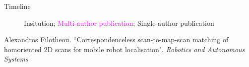 \begin{frame}{Timeline}

\begin{figure}[t!] \centering
        
        \caption{\textcolor[RGB]{32,74,135}{Insitution}; \textcolor{magenta}{Multi-author publication}; \textcolor[RGB]{78,154,0}{Single-author publication}}
\end{figure}

\placebottom \tiny
\textcolor[RGB]{78,154,0}{Alexandros Filotheou. ``Correspondenceless scan-to-map-scan matching of homoriented 2D scans
for mobile robot localisation". \textit{Robotics and Autonomous Systems}}

\end{frame}
